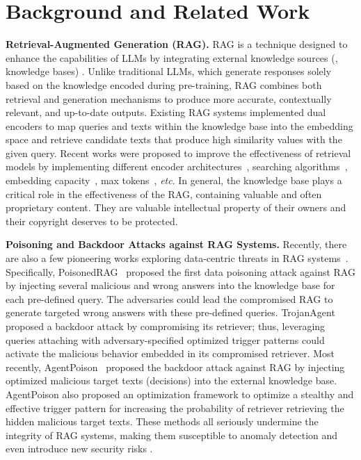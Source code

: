 \section{Background and Related Work}
\noindent \textbf{Retrieval-Augmented Generation (RAG).} RAG is a technique designed to enhance the capabilities of LLMs by integrating external knowledge sources (\ie, knowledge bases) \citep{lewis2020retrieval}. Unlike traditional LLMs, which generate responses solely based on the knowledge encoded during pre-training, RAG combines both retrieval and generation mechanisms to produce more accurate, contextually relevant, and up-to-date outputs. Existing RAG systems implemented dual encoders to map queries and texts within the knowledge base into the embedding space and retrieve candidate texts that produce high similarity values with the given query. Recent works were proposed to improve the effectiveness of retrieval models by implementing different encoder architectures~\citep{nogueira2019passage,humeau2019poly,khattab2021relevance}, searching algorithms~\citep{xiongapproximate}, embedding capacity~\citep{gunther2023jina}, max tokens~\citep{muennighoff2022mteb}, \textit{etc}. In general, the knowledge base plays a critical role in the effectiveness of the RAG, containing valuable and often proprietary content. They are valuable intellectual property of their owners and their copyright deserves to be protected. 






\noindent \textbf{Poisoning and Backdoor Attacks against RAG Systems.} Recently, there are also a few pioneering works exploring data-centric threats in RAG systems~\citep{zou2024poisonedrag,xiangbadchain,chen2024agentpoison,cheng2024trojanrag}. Specifically, PoisonedRAG~\citep{zou2024poisonedrag} proposed the first data poisoning attack against RAG by injecting several malicious and wrong answers into the knowledge base for each pre-defined query. The adversaries could lead the compromised RAG to generate targeted wrong answers with these pre-defined queries. TrojanAgent~\citep{cheng2024trojanrag} proposed a backdoor attack by compromising its retriever; thus, leveraging queries attaching with adversary-specified optimized trigger patterns could activate the malicious behavior embedded in its compromised retriever. Most recently, AgentPoison~\citep{chen2024agentpoison} proposed the backdoor attack against RAG by injecting optimized malicious target texts (decisions) into the external knowledge base. AgentPoison also proposed an optimization framework to optimize a stealthy and effective trigger pattern for increasing the probability of retriever retrieving the hidden malicious target texts. These methods all seriously undermine the integrity of RAG systems, making them susceptible to anomaly detection and even introduce new security risks \cite{du2025sok}.


